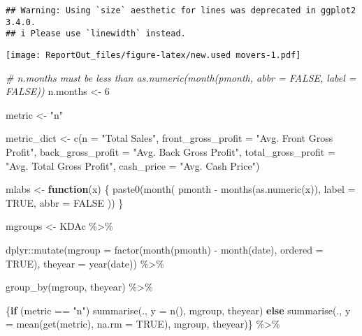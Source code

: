 \documentclass[
]{article}
\newenvironment{Shaded}{\begin{snugshade}}{\end{snugshade}}
\newcommand{\AttributeTok}[1]{\textcolor[rgb]{0.77,0.63,0.00}{#1}}
\newcommand{\CommentTok}[1]{\textcolor[rgb]{0.56,0.35,0.01}{\textit{#1}}}
\newcommand{\ConstantTok}[1]{\textcolor[rgb]{0.00,0.00,0.00}{#1}}
\newcommand{\ControlFlowTok}[1]{\textcolor[rgb]{0.13,0.29,0.53}{\textbf{#1}}}
\newcommand{\DecValTok}[1]{\textcolor[rgb]{0.00,0.00,0.81}{#1}}
\newcommand{\FunctionTok}[1]{\textcolor[rgb]{0.00,0.00,0.00}{#1}}
\newcommand{\NormalTok}[1]{#1}
\newcommand{\OtherTok}[1]{\textcolor[rgb]{0.56,0.35,0.01}{#1}}
\newcommand{\SpecialCharTok}[1]{\textcolor[rgb]{0.00,0.00,0.00}{#1}}
\newcommand{\StringTok}[1]{\textcolor[rgb]{0.31,0.60,0.02}{#1}}
\begin{document}
\begin{verbatim}
## Warning: Using `size` aesthetic for lines was deprecated in ggplot2 3.4.0.
## i Please use `linewidth` instead.
\end{verbatim}

\texttt{[image: ReportOut\_files/figure-latex/new.used movers-1.pdf]}

\begin{Shaded}
\begin{Highlighting}[]
\CommentTok{\# n.months must be less than as.numeric(month(pmonth, abbr = FALSE, label = FALSE))}
\NormalTok{n.months }\OtherTok{\textless{}{-}} \DecValTok{6}

\NormalTok{metric }\OtherTok{\textless{}{-}} \StringTok{"n"}

\NormalTok{metric\_dict }\OtherTok{\textless{}{-}} \FunctionTok{c}\NormalTok{(}\AttributeTok{n =} \StringTok{"Total Sales"}\NormalTok{, }
                 \AttributeTok{front\_gross\_profit =} \StringTok{"Avg. Front Gross Profit"}\NormalTok{, }
                 \AttributeTok{back\_gross\_profit =} \StringTok{"Avg. Back Gross Profit"}\NormalTok{,}
                 \AttributeTok{total\_gross\_profit =} \StringTok{"Avg. Total Gross Profit"}\NormalTok{,}
                 \AttributeTok{cash\_price =} \StringTok{"Avg. Cash Price"}\NormalTok{)}

\NormalTok{mlabs }\OtherTok{\textless{}{-}} \ControlFlowTok{function}\NormalTok{(x) \{}
  \FunctionTok{paste0}\NormalTok{(}\FunctionTok{month}\NormalTok{(}
\NormalTok{    pmonth }\SpecialCharTok{{-}} \FunctionTok{months}\NormalTok{(}\FunctionTok{as.numeric}\NormalTok{(x)),}
    \AttributeTok{label =} \ConstantTok{TRUE}\NormalTok{,}
    \AttributeTok{abbr =} \ConstantTok{FALSE}
\NormalTok{  ))}
\NormalTok{\}}

\NormalTok{mgroups }\OtherTok{\textless{}{-}}\NormalTok{ KDAc }\SpecialCharTok{\%\textgreater{}\%}
  
\NormalTok{  dplyr}\SpecialCharTok{::}\FunctionTok{mutate}\NormalTok{(}\AttributeTok{mgroup =} \FunctionTok{factor}\NormalTok{(}\FunctionTok{month}\NormalTok{(pmonth) }\SpecialCharTok{{-}} \FunctionTok{month}\NormalTok{(date), }\AttributeTok{ordered =} \ConstantTok{TRUE}\NormalTok{),}
                \AttributeTok{theyear =} \FunctionTok{year}\NormalTok{(date)) }\SpecialCharTok{\%\textgreater{}\%}
  
  \FunctionTok{group\_by}\NormalTok{(mgroup, theyear) }\SpecialCharTok{\%\textgreater{}\%}
  
\NormalTok{  \{}\ControlFlowTok{if}\NormalTok{ (metric }\SpecialCharTok{==} \StringTok{"n"}\NormalTok{)}
    \FunctionTok{summarise}\NormalTok{(., }\AttributeTok{y =} \FunctionTok{n}\NormalTok{(), mgroup, theyear)}
    \ControlFlowTok{else}
      \FunctionTok{summarise}\NormalTok{(., }\AttributeTok{y =} \FunctionTok{mean}\NormalTok{(}\FunctionTok{get}\NormalTok{(metric), }\AttributeTok{na.rm =} \ConstantTok{TRUE}\NormalTok{), mgroup, theyear)\} }\SpecialCharTok{\%\textgreater{}\%}


\end{Highlighting}
\end{Shaded}
\end{document}

